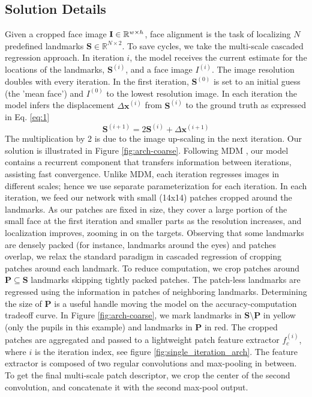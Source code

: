 \documentclass[twocolumn]{article}
\begin{document}
\subsection{Solution Details}
Given a cropped face image $\bold{I} \in \mathbb R^{w \times h}$, face alignment is the task of localizing $N$ predefined landmarks $\mathbf{S} \in \mathbb R^{N \times 2}$. To save cycles, we take the multi-scale cascaded regression approach. In iteration $i$, the model receives the current estimate for the locations of the landmarks, $\mathbf{S}^{(i)}$, and a face image $I^{(i)}$. The image resolution doubles with every iteration. In the first iteration, $\mathbf{S}^{(0)}$ is set to an initial guess (the 'mean face') and $I^{(0)}$ to the lowest resolution image. In each iteration the model infers the displacement $\Delta \mathbf{x}^{(i)}$ from $\mathbf{S}^{(i)}$ to the ground truth as expressed in Eq. \ref{eq:1}
\begin{equation}
\mathbf{S}^{(i+1)} = 2\mathbf{S}^{(i)} + \Delta \mathbf{x}^{(i+1)}
\label{eq:1}
\end{equation}
The multiplication by 2 is due to the image up-scaling in the next iteration.
Our solution is illustrated in Figure \ref{fig:arch-coarse}.
Following MDM \cite{trigeorgis2016mnemonic}, our model contains a recurrent component that transfers information between iterations, assisting fast convergence. Unlike MDM, each iteration regresses images in different scales; hence we use separate parameterization for each iteration.
In each iteration, we feed our network with small (14x14) patches cropped around the landmarks. As our patches are fixed in size, they cover a large portion of the small face at the first iteration and smaller parts as the resolution increases, and localization improves, zooming in on the targets. Observing that some landmarks are densely packed (for instance, landmarks around the eyes) and patches overlap, we relax the standard paradigm in cascaded regression of cropping patches around each landmark. To reduce computation, we crop patches around $\mathbf{P} \subseteq \mathbf{S}$ landmarks skipping tightly packed patches. The patch-less landmarks are regressed using the information in patches of neighboring landmarks. Determining the size of $\mathbf{P}$ is a useful handle moving the model on the accuracy-computation tradeoff curve.
In Figure \ref{fig:arch-coarse}, we mark landmarks in $\mathbf{S} \setminus \mathbf{P}$ in yellow (only the pupils in this example) and landmarks in $\mathbf{P}$ in red. The cropped patches are aggregated and passed to a lightweight patch feature extractor $f_c^{(i)}$, where $i$ is the iteration index, see figure \ref{fig:single_iteration_arch}. The feature extractor is composed of two regular convolutions and max-pooling in between. To get the final multi-scale patch descriptor, we crop the center of the second convolution, and concatenate it with the second max-pool output.
\end{document}
